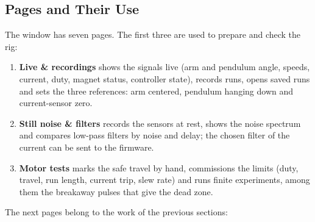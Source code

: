 \documentclass[a4paper,11pt]{article}
\begin{document}
\subsection{Pages and Their Use}
\label{sec:app_pages}
The window has seven pages. The first three are used to prepare and check the rig:
\begin{enumerate}
  \item \textbf{Live \& recordings} shows the signals live (arm and pendulum angle, speeds, current, duty, magnet status, controller state), records runs, opens saved runs and sets the three references: arm centered, pendulum hanging down and current-sensor zero.
  \item \textbf{Still noise \& filters} records the sensors at rest, shows the noise spectrum and compares low-pass filters by noise and delay; the chosen filter of the current can be sent to the firmware.
  \item \textbf{Motor tests} marks the safe travel by hand, commissions the limits (duty, travel, run length, current trip, slew rate) and runs finite experiments, among them the breakaway pulses that give the dead zone.
\end{enumerate}
The next pages belong to the work of the previous sections:
\end{document}
